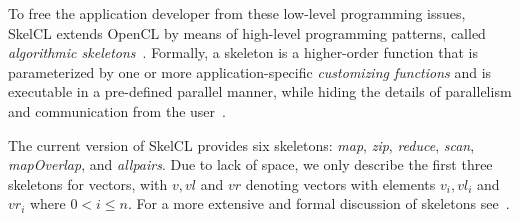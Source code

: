 To free the application developer from these low-level programming issues, SkelCL extends OpenCL by means of high-level programming patterns, called \emph{algorithmic skeletons}~\cite{gc11}.
Formally, a skeleton is a higher-order function that is parameterized by one or more application-specific \emph{customizing functions} and is executable in a pre-defined parallel manner, while hiding the details of parallelism and communication from the user~\cite{gc11}.

The current version of SkelCL provides six skeletons: \emph{map}, \emph{zip}, \emph{reduce}, \emph{scan}, \emph{mapOverlap}, and \emph{allpairs}.
Due to lack of space, we only describe the first three skeletons for vectors, with $v, vl$ and $vr$ denoting vectors with elements $v_i, vl_i$ and $vr_i$ where $0 < i \leq n$.
For a more extensive and formal discussion of skeletons see~\cite{gc11}.

